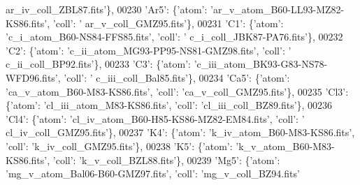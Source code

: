 \begin{DoxyCode}
{      ar\_iv\_coll\_ZBL87.fits'}\},
00230                             \textcolor{stringliteral}{'Ar5'}: \{\textcolor{stringliteral}{'atom'}: \textcolor{stringliteral}{'ar\_v\_atom\_B60-LL93-MZ82-KS86.fits'}, \textcolor{stringliteral}{'coll'}: \textcolor{stringliteral}{'
      ar\_v\_coll\_GMZ95.fits'}\},
00231                             \textcolor{stringliteral}{'C1'}: \{\textcolor{stringliteral}{'atom'}: \textcolor{stringliteral}{'c\_i\_atom\_B60-NS84-FFS85.fits'}, \textcolor{stringliteral}{'coll'}: \textcolor{stringliteral}{'
      c\_i\_coll\_JBK87-PA76.fits'}\},
00232                             \textcolor{stringliteral}{'C2'}: \{\textcolor{stringliteral}{'atom'}: \textcolor{stringliteral}{'c\_ii\_atom\_MG93-PP95-NS81-GMZ98.fits'}, \textcolor{stringliteral}{'coll'}: \textcolor{stringliteral}{'
      c\_ii\_coll\_BP92.fits'}\},
00233                             \textcolor{stringliteral}{'C3'}: \{\textcolor{stringliteral}{'atom'}: \textcolor{stringliteral}{'c\_iii\_atom\_BK93-G83-NS78-WFD96.fits'}, \textcolor{stringliteral}{'coll'}: \textcolor{stringliteral}{'
      c\_iii\_coll\_Bal85.fits'}\},
00234                             \textcolor{stringliteral}{'Ca5'}: \{\textcolor{stringliteral}{'atom'}: \textcolor{stringliteral}{'ca\_v\_atom\_B60-M83-KS86.fits'}, \textcolor{stringliteral}{'coll'}: \textcolor{stringliteral}{'ca\_v\_coll\_GMZ95.fits'}\},
00235                             \textcolor{stringliteral}{'Cl3'}: \{\textcolor{stringliteral}{'atom'}: \textcolor{stringliteral}{'cl\_iii\_atom\_M83-KS86.fits'}, \textcolor{stringliteral}{'coll'}: \textcolor{stringliteral}{'cl\_iii\_coll\_BZ89.fits'}\},
00236                             \textcolor{stringliteral}{'Cl4'}: \{\textcolor{stringliteral}{'atom'}: \textcolor{stringliteral}{'cl\_iv\_atom\_B60-H85-KS86-MZ82-EM84.fits'}, \textcolor{stringliteral}{'coll'}: \textcolor{stringliteral}{'
      cl\_iv\_coll\_GMZ95.fits'}\},
00237                             \textcolor{stringliteral}{'K4'}: \{\textcolor{stringliteral}{'atom'}: \textcolor{stringliteral}{'k\_iv\_atom\_B60-M83-KS86.fits'}, \textcolor{stringliteral}{'coll'}: \textcolor{stringliteral}{'k\_iv\_coll\_GMZ95.fits'}\},
00238                             \textcolor{stringliteral}{'K5'}: \{\textcolor{stringliteral}{'atom'}: \textcolor{stringliteral}{'k\_v\_atom\_B60-M83-KS86.fits'}, \textcolor{stringliteral}{'coll'}: \textcolor{stringliteral}{'k\_v\_coll\_BZL88.fits'}\},
00239                             \textcolor{stringliteral}{'Mg5'}: \{\textcolor{stringliteral}{'atom'}: \textcolor{stringliteral}{'mg\_v\_atom\_Bal06-B60-GMZ97.fits'}, \textcolor{stringliteral}{'coll'}: \textcolor{stringliteral}{'mg\_v\_coll\_BZ94.fits'}

\end{DoxyCode}
